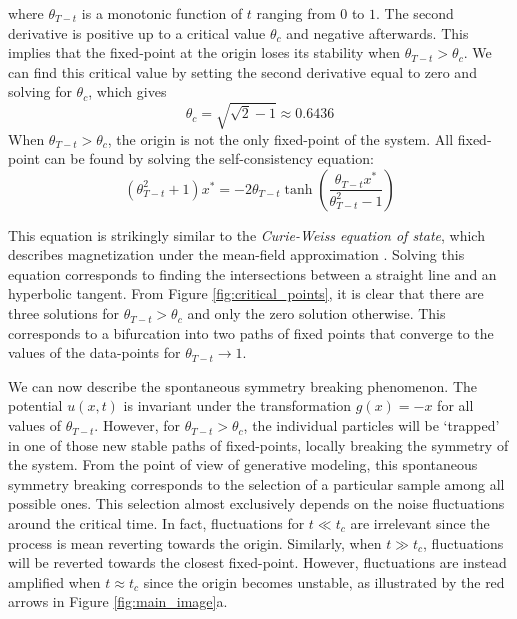 \documentclass{article}
\begin{document}
where $\theta_{T-t}$ is a monotonic function of  $t$ ranging from $0$ to $1$. The second derivative is positive up to a critical value $\theta_c$ and negative afterwards. This implies that the fixed-point at the origin loses its stability when $\theta_{T-t} > \theta_c$. We can find this critical value by setting the second derivative equal to zero and solving for $\theta_c$, which gives
\begin{equation}\label{eq: critical theta 1d}
    \theta_c = \sqrt{\sqrt{2} - 1} \approx 0.6436
\end{equation}
When $\theta_{T-t} > \theta_c$, the origin is not the only fixed-point of the system. All fixed-point can be found by solving the self-consistency equation:
\begin{equation}
    (\theta_{T-t}^2 + 1) x^* = -2 \theta_{T-t} \tanh{\left(\frac{ \theta_{T-t} x^*}{\theta_{T-t}^2 - 1} \right)}
    \label{eq:all-fixed-points}
\end{equation}


This equation is strikingly similar to the \emph{Curie-Weiss equation of state}, which describes magnetization under the mean-field approximation \citep{tauber2014critical}. Solving this equation corresponds to finding the intersections between a straight line and an hyperbolic tangent. From Figure \ref{fig:critical_points}, it is clear that there are three solutions for $\theta_{T-t} > \theta_c$ and only the zero solution otherwise. This corresponds to a bifurcation into two paths of fixed points that converge to the values of the data-points for $\theta_{T-t} \rightarrow 1$.

We can now describe the spontaneous symmetry breaking phenomenon. The potential $u(x, t)$ is invariant under the transformation $g(x) = -x$ for all values of $\theta_{T-t}$. However, for $\theta_{T-t} > \theta_c$, the individual particles will be `trapped' in one of those new stable paths of fixed-points, locally breaking the symmetry of the system. From the point of view of generative modeling, this spontaneous symmetry breaking corresponds to the selection of a particular sample among all possible ones. This selection almost exclusively depends on the noise fluctuations around the critical time. In fact, fluctuations for $t \ll t_c$ are irrelevant since the process is mean reverting towards the origin. Similarly, when $t \gg t_c$, fluctuations will be reverted towards the closest fixed-point. However, fluctuations are instead amplified when $t \approx t_c$ since the origin becomes unstable, as illustrated by the red arrows in Figure \ref{fig:main_image}a.
\end{document}
